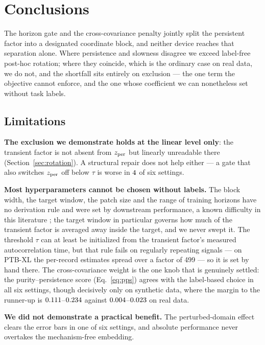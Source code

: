 \section{Conclusions}

The horizon gate and the cross-covariance penalty jointly split the persistent factor into a designated coordinate block, and neither device reaches that separation alone. Where persistence and slowness disagree we exceed label-free post-hoc rotation; where they coincide, which is the ordinary case on real data, we do not, and the shortfall sits entirely on exclusion --- the one term the objective cannot enforce, and the one whose coefficient we can nonetheless set without task labels.

\subsection{Limitations}
\label{sec:limits}

\textbf{The exclusion we demonstrate holds at the linear level only}: the transient factor is not absent from $z_{\mathrm{per}}$ but linearly unreadable there (Section~\ref{sec:rotation}). A structural repair does not help either --- a gate that also switches $z_{\mathrm{per}}$ off below $\tau$ is worse in $4$ of six settings.

\textbf{Most hyperparameters cannot be chosen without labels.} The block width, the target window, the patch size and the range of training horizons have no derivation rule and were set by downstream performance, a known difficulty in this literature \citep{locatello2019}; the target window in particular governs how much of the transient factor is averaged away inside the target, and we never swept it. The threshold $\tau$ can at least be initialized from the transient factor's measured autocorrelation time, but that rule fails on regularly repeating signals --- on PTB-XL the per-record estimates spread over a factor of 499 --- so it is set by hand there. The cross-covariance weight is the one knob that is genuinely settled: the purity--persistence score (Eq.~\ref{eq:pps}) agrees with the label-based choice in all six settings, though decisively only on synthetic data, where the margin to the runner-up is $0.111$--$0.234$ against $0.004$--$0.023$ on real data.

\textbf{We did not demonstrate a practical benefit.} The perturbed-domain effect clears the error bars in one of six settings, and absolute performance never overtakes the mechanism-free embedding.


